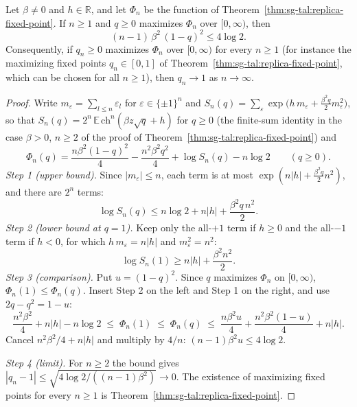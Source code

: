 \begin{theorem}\label{thm:sg-tal:replica-large-n}
\leanok
{}
Let $\beta\ne0$ and $h\in\mathbb R$, and let $\Phi_n$ be the function of Theorem~\ref{thm:sg-tal:replica-fixed-point}. If $n\ge1$ and $q\ge0$ maximizes $\Phi_n$ over $[0,\infty)$, then
\[
(n-1)\,\beta^2\,(1-q)^2\le 4\log 2 .
\]
Consequently, if $q_n\ge0$ maximizes $\Phi_n$ over $[0,\infty)$ for every $n\ge1$ (for instance the maximizing fixed points $q_n\in[0,1]$ of Theorem~\ref{thm:sg-tal:replica-fixed-point}, which can be chosen for all $n\ge1$), then $q_n\to1$ as $n\to\infty$.
\end{theorem}
\begin{proof}
\leanok
Write $m_\varepsilon=\sum_{l\le n}\varepsilon_l$ for $\varepsilon\in\{\pm1\}^n$ and $S_n(q)=\sum_\varepsilon\exp\big(h\,m_\varepsilon+\tfrac{\beta^2q}2m_\varepsilon^2\big)$, so that $S_n(q)=2^n\,\mathbb E\,\mathrm{ch}^n(\beta z\sqrt q+h)$ for $q\ge0$ (the finite-sum identity in the case $\beta>0$, $n\ge2$ of the proof of Theorem~\ref{thm:sg-tal:replica-fixed-point}) and
\[
\Phi_n(q)=\frac{n\beta^2(1-q)^2}4-\frac{n^2\beta^2q^2}4+\log S_n(q)-n\log2\qquad(q\ge0).
\]
\emph{Step 1 (upper bound).} Since $|m_\varepsilon|\le n$, each term is at most $\exp(n|h|+\tfrac{\beta^2q}2n^2)$, and there are $2^n$ terms:
\[
\log S_n(q)\le n\log2+n|h|+\frac{\beta^2q\,n^2}2 .
\]
\emph{Step 2 (lower bound at $q=1$).} Keep only the all-$+1$ term if $h\ge0$ and the all-$-1$ term if $h<0$, for which $h\,m_\varepsilon=n|h|$ and $m_\varepsilon^2=n^2$:
\[
\log S_n(1)\ge n|h|+\frac{\beta^2n^2}2 .
\]
\emph{Step 3 (comparison).} Put $u=(1-q)^2$. Since $q$ maximizes $\Phi_n$ on $[0,\infty)$, $\Phi_n(1)\le\Phi_n(q)$. Insert Step 2 on the left and Step 1 on the right, and use $2q-q^2=1-u$:
\[
\frac{n^2\beta^2}4+n|h|-n\log2\;\le\;\Phi_n(1)\;\le\;\Phi_n(q)\;\le\;\frac{n\beta^2u}4+\frac{n^2\beta^2(1-u)}4+n|h| .
\]
Cancel $n^2\beta^2/4+n|h|$ and multiply by $4/n$: $(n-1)\beta^2u\le4\log2$.

\emph{Step 4 (limit).} For $n\ge2$ the bound gives $|q_n-1|\le\sqrt{4\log2/((n-1)\beta^2)}\to0$. The existence of maximizing fixed points for every $n\ge1$ is Theorem~\ref{thm:sg-tal:replica-fixed-point}.
\end{proof}

